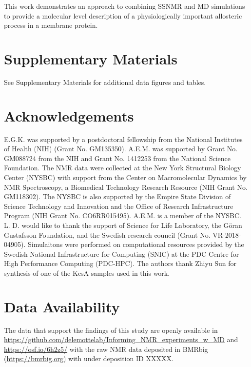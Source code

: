 \documentclass[%
 aip,
 amsmath,amssymb,
 preprint,%
]{revtex4-1}
\begin{document}
This work demonstrates an approach to combining  SSNMR and MD simulations to provide a molecular level description of a physiologically important allosteric process in a membrane protein.

  
\section{Supplementary Materials}
See Supplementary Materials for additional data figures and tables. 

\section{Acknowledgements}
E.G.K. was supported by a postdoctoral fellowship from the National Institutes of Health (NIH) (Grant No. GM135350). A.E.M. was supported by Grant No. GM088724 from the NIH and Grant No. 1412253 from the National Science Foundation. The NMR data were collected at the New York Structural Biology Center (NYSBC) with support from the Center on Macromolecular Dynamics by NMR Spectroscopy, a Biomedical Technology Research Resource (NIH Grant No. GM118302). The NYSBC is also supported by the Empire State Division of Science Technology and Innovation and the Office of Research Infrastructure Program (NIH Grant No. CO6RR015495). A.E.M. is a member of the NYSBC. L. D. would like to thank the support of Science for Life Laboratory, the Göran Gustafsson Foundation, and the Swedish research council (Grant No. VR-2018-04905). Simulaitons were performed on computational resources provided by the Swedish National Infrastructure for Computing (SNIC) at the PDC Centre for High Performance Computing (PDC-HPC). The authors thank Zhiyu Sun for synthesis of one of the KcsA samples used in this work.

\section{Data Availability}

The data that support the findings of this study are openly available in \url{https://github.com/delemottelab/Informing_NMR_experiments_w_MD} and \url{https://osf.io/6h2z5/} with the raw NMR data deposited in BMRbig (\url{https://bmrbig.org}) with under deposition ID XXXXX.

\end{document}
